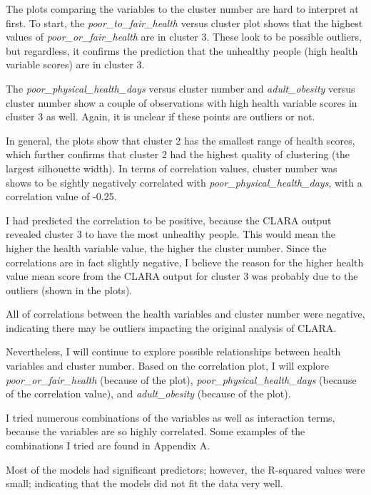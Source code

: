 \documentclass[12pt,twoside]{amherstthesis}
\begin{document}
  The plots comparing the variables to the cluster number are hard to
  interpret at first. To start, the \emph{poor\_to\_fair\_health} versus
  cluster plot shows that the highest values of
  \emph{poor\_or\_fair\_health} are in cluster 3. These look to be
  possible outliers, but regardless, it confirms the prediction that the
  unhealthy people (high health variable scores) are in cluster 3.
  
  The \emph{poor\_physical\_health\_days} versus cluster number and
  \emph{adult\_obesity} versus cluster number show a couple of
  observations with high health variable scores in cluster 3 as well.
  Again, it is unclear if these points are outliers or not.
  
  In general, the plots show that cluster 2 has the smallest range of
  health scores, which further confirms that cluster 2 had the highest
  quality of clustering (the largest silhouette width). In terms of
  correlation values, cluster number was shows to be sightly negatively
  correlated with \emph{poor\_physical\_health\_days}, with a correlation
  value of -0.25.
  
  I had predicted the correlation to be positive, because the CLARA output
  revealed cluster 3 to have the most unhealthy people. This would mean
  the higher the health variable value, the higher the cluster number.
  Since the correlations are in fact slightly negative, I believe the
  reason for the higher health value mean score from the CLARA output for
  cluster 3 was probably due to the outliers (shown in the plots).
  
  All of correlations between the health variables and cluster number were
  negative, indicating there may be outliers impacting the original
  analysis of CLARA.
  
  Nevertheless, I will continue to explore possible relationships between
  health variables and cluster number. Based on the correlation plot, I
  will explore \emph{poor\_or\_fair\_health} (because of the plot),
  \emph{poor\_physical\_health\_days} (because of the correlation value),
  and \emph{adult\_obesity} (because of the plot).
  
  I tried numerous combinations of the variables as well as interaction
  terms, because the variables are so highly correlated. Some examples of
  the combinations I tried are found in Appendix A.
  
  Most of the models had significant predictors; however, the R-squared
  values were small; indicating that the models did not fit the data very
  well.
  
\end{document}
